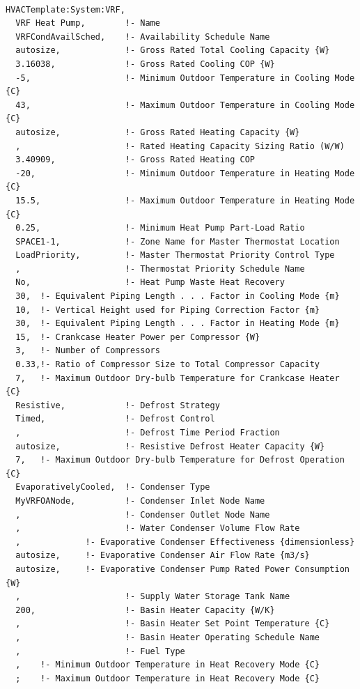 \begin{lstlisting}

HVACTemplate:System:VRF,
  VRF Heat Pump,        !- Name
  VRFCondAvailSched,    !- Availability Schedule Name
  autosize,             !- Gross Rated Total Cooling Capacity {W}
  3.16038,              !- Gross Rated Cooling COP {W}
  -5,                   !- Minimum Outdoor Temperature in Cooling Mode {C}
  43,                   !- Maximum Outdoor Temperature in Cooling Mode {C}
  autosize,             !- Gross Rated Heating Capacity {W}
  ,                     !- Rated Heating Capacity Sizing Ratio (W/W)
  3.40909,              !- Gross Rated Heating COP
  -20,                  !- Minimum Outdoor Temperature in Heating Mode {C}
  15.5,                 !- Maximum Outdoor Temperature in Heating Mode {C}
  0.25,                 !- Minimum Heat Pump Part-Load Ratio
  SPACE1-1,             !- Zone Name for Master Thermostat Location
  LoadPriority,         !- Master Thermostat Priority Control Type
  ,                     !- Thermostat Priority Schedule Name
  No,                   !- Heat Pump Waste Heat Recovery
  30,  !- Equivalent Piping Length . . . Factor in Cooling Mode {m}
  10,  !- Vertical Height used for Piping Correction Factor {m}
  30,  !- Equivalent Piping Length . . . Factor in Heating Mode {m}
  15,  !- Crankcase Heater Power per Compressor {W}
  3,   !- Number of Compressors
  0.33,!- Ratio of Compressor Size to Total Compressor Capacity
  7,   !- Maximum Outdoor Dry-bulb Temperature for Crankcase Heater {C}
  Resistive,            !- Defrost Strategy
  Timed,                !- Defrost Control
  ,                     !- Defrost Time Period Fraction
  autosize,             !- Resistive Defrost Heater Capacity {W}
  7,   !- Maximum Outdoor Dry-bulb Temperature for Defrost Operation {C}
  EvaporativelyCooled,  !- Condenser Type
  MyVRFOANode,          !- Condenser Inlet Node Name
  ,                     !- Condenser Outlet Node Name
  ,                     !- Water Condenser Volume Flow Rate
  ,             !- Evaporative Condenser Effectiveness {dimensionless}
  autosize,     !- Evaporative Condenser Air Flow Rate {m3/s}
  autosize,     !- Evaporative Condenser Pump Rated Power Consumption {W}
  ,                     !- Supply Water Storage Tank Name
  200,                  !- Basin Heater Capacity {W/K}
  ,                     !- Basin Heater Set Point Temperature {C}
  ,                     !- Basin Heater Operating Schedule Name
  ,                     !- Fuel Type
  ,    !- Minimum Outdoor Temperature in Heat Recovery Mode {C}
  ;    !- Maximum Outdoor Temperature in Heat Recovery Mode {C}
\end{lstlisting}

